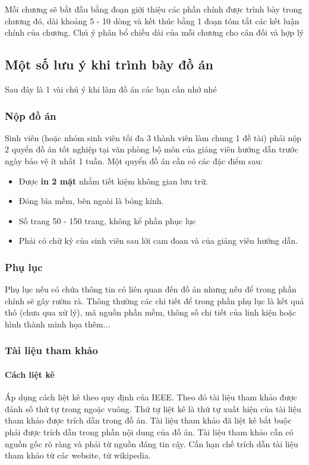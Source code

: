 \setcounter{section}{2}
Mỗi chương sẽ bắt đầu bằng đoạn giới thiệu các phần chính được trình bày trong chương đó, dài khoảng 5 - 10 dòng và kết thúc bằng 1 đoạn tóm tắt các kết luận chính của chương. Chú ý phân bổ chiều dài của mỗi chương cho cân đối và hợp lý 
\subsection{Một số lưu ý khi trình bày đồ án}
Sau đây là 1 vài chú ý khi làm đồ án các bạn cần nhớ nhé
\subsubsection{Nộp đồ án}
Sinh viên (hoặc nhóm sinh viên tối đa 3 thành viên làm chung 1 đề tài) phải nộp 2 quyển đồ án tốt nghiệp tại văn phòng bộ môn của giảng viên hướng dẫn trước ngày bảo vệ ít nhất 1 tuần. Một quyển đồ án cần có các đặc điểm sau:
\begin{itemize}
    \item Được \textbf{in 2 mặt} nhằm tiết kiệm không gian lưu trữ.
    \item Đóng bìa mềm, bên ngoài là bóng kính. 
    \item Số trang 50 - 150 trang, không kể phần phục lục
    \item Phải có chữ ký của sinh viên sau lời cam đoan và của giảng viên hướng dẫn. 
\end{itemize}
\subsubsection{Phụ lục}
Phụ lục nếu có chứa thông tin có liên quan đến đồ án nhưng nếu để trong phần chính sẽ gây rườm rà. Thông thường các chi tiết để trong phần phụ lục là kết quả thô (chưa qua xử lý), mã nguồn phần mềm, thông số chi tiết của linh kiện hoặc hình thành minh họa thêm...
\subsubsection{Tài liệu tham khảo}
\paragraph{Cách liệt kê} \mbox{} %

Áp dụng cách liệt kê theo quy định của IEEE. Theo đó tài liệu tham khảo được đánh số thứ tự trong ngoặc vuông. Thứ tự liệt kê là thứ tự xuất hiện của tài liệu tham khảo được trích dẫn trong đồ án. Tài liệu tham khảo đã liệt kê bắt buộc phải được trích dẫn trong phần nội dung của đồ án. Tài liệu tham khảo cần có nguồn gốc rõ ràng và phải từ nguồn đáng tin cậy. Cần hạn chế trích dẫn tài liệu tham khảo từ các website, từ wikipedia.
